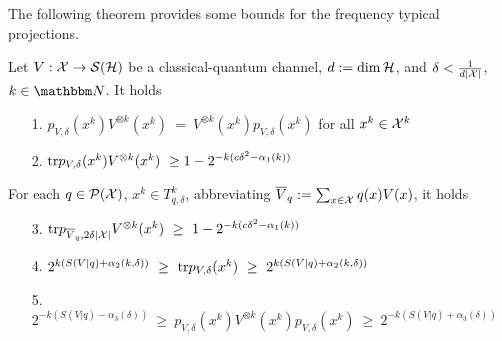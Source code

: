        The following theorem provides some bounds for the frequency typical projections.
       \begin{theorem}\label{th:freq_typ_prj_bounds}
        Let $V: {\mathcal X} \rightarrow {\mathcal S}({\mathcal H})$ be a classical-quantum channel, $d := \dim {\mathcal H}$, and $\delta < \frac{1}{d |{\mathcal X}|}$, $k \in \bbmN$. It holds
        \begin{enumerate}
         \item [1.] $p_{V,\delta}(x^k)V^{\otimes k}(x^k) \ = \ V^{\otimes k}(x^k) p_{V,\delta}(x^k)$ for all $x^k \in {\mathcal X}^k$
         \item [2.] $\mathrm{tr} p_{V,\delta}(x^k)V^{\otimes k}(x^k) \ \geq 1 - 2^{-k(c \delta^2 - \alpha_1(k))}$
        \end{enumerate}
        For each $q \in {\mathcal P}({\mathcal X})$, $x^k \in T_{q,\delta}^k$, abbreviating $\overline{V}_q := \sum_{x \in {\mathcal X}} q(x) V(x)$, it holds
        \begin{enumerate}
         \item [3.] $\mathrm{tr} p_{\overline{V}_q, 2 \delta |{\mathcal X}|} V^{\otimes k}(x^k) \ \geq \ 1 - 2^{-k(c \delta^2 - \alpha_1(k))}$
         \item [4.] $2^{k(S(V|q) + \alpha_2(k,\delta))} \ \geq \ \mathrm{tr} p_{V,\delta}(x^k) \ \geq \ 2^{k(S(V|q) + \alpha_2(k,\delta))}$
         \item [5.] $2^{-k(S(V|q) - \alpha_3(\delta))} \ \geq \ p_{V,\delta}(x^k)V^{\otimes k}(x^k) p_{V,\delta}(x^k) \ \geq \ 2^{-k(S(V|q) + \alpha_3(\delta))}$
        \end{enumerate}
       \end{theorem}

         
     
